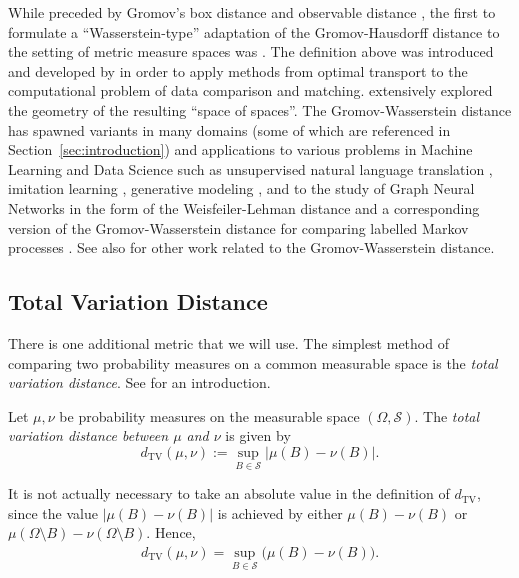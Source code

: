 \documentclass[twoside,11pt]{article}
\newcommand{\TV}{d_{\mathrm{TV}}}
\begin{document}
While preceded by Gromov's box distance and observable distance \citep[Ch. 3{\small $\frac12$}]{gromov_structures_1981}, the first to formulate a ``Wasserstein-type'' adaptation of the Gromov-Hausdorff distance to the setting of metric measure spaces was \citet{sturm_geometry_2006}. The definition above was introduced and developed by \citet{memoli_GH_Distance, memoli_gromovwasserstein_2011} in order to apply methods from optimal transport to the computational problem of data comparison and matching. \citet{sturm_space_2012} extensively explored the geometry of the resulting ``space of spaces''.
The Gromov-Wasserstein distance has spawned variants in many domains (some of which are referenced in Section~\ref{sec:introduction}) and applications to various problems in Machine Learning and Data Science such as unsupervised natural language translation \citep{alvarez-melis_gromov-wasserstein_2018}, imitation learning \citep{fickinger_cross-domain_2022},  generative modeling \citep{bunne_learning_2019}, and to the study of Graph Neural Networks in the form of the Weisfeiler-Lehman distance and a corresponding version of the Gromov-Wasserstein distance for comparing labelled Markov processes \citep{chen2022weisfeiler}.  See also \cite{peyre2019computational,Vayer2020FusedGD,titouan2019sliced,peyre_gromov-wasserstein_2016,scetbon2022linear,chowdhury2020gromov,sejourne_unbalanced_2021,delon2022gromov,beier2022linear,le2022entropic,dumont2024existence,arya2023gromov} for other work related to the Gromov-Wasserstein distance.



\subsection{Total Variation Distance}\label{subsec:total-variation}
There is one additional metric that we will use. The simplest method of comparing two probability measures on a common measurable space is the \emph{total variation distance}. See \citet[Sec 4.1]{markov_2017} for an introduction. 

\begin{definition}\label{def:tv-distance} 
    Let $\mu,\nu$ be probability measures on the measurable space $(\Omega, \mathcal S)$. The \emph{total variation distance between $\mu$ and $\nu$} is given by
    \[\TV(\mu,\nu) := \sup_{B \in \mathcal S}\big| \mu(B) - \nu(B) \big|.\]
\end{definition}

It is not actually necessary to take an absolute value in the definition of $\TV$, since the value $| \mu(B) - \nu(B)|$ is achieved by either $\mu(B) - \nu(B)$ or $\mu(\Omega\setminus B) - \nu(\Omega \setminus B)$. Hence,
\begin{align*}
    \TV(\mu,\nu) = \sup_{B\in \mathcal S} \big(\mu(B) - \nu(B)\big).
\end{align*}
\end{document}
